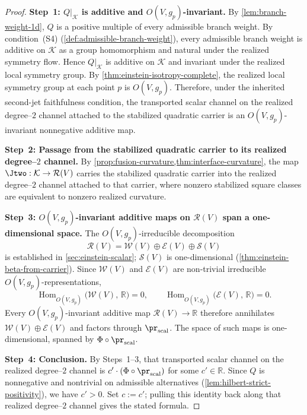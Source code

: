 \begin{proof}
\textbf{Step~1: $Q|_{\mathcal K}$ is additive and $O(V,g_p)$-invariant.}
By \cref{lem:branch-weight-1d}, $Q$ is a positive multiple of every
admissible branch weight.
By condition~\textup{(S4)} (\cref{def:admissible-branch-weight}), every
admissible branch weight is additive on $\mathcal K$ as a group
homomorphism and natural under the realized symmetry flow.
Hence $Q|_{\mathcal K}$ is additive on $\mathcal K$ and invariant under
the realized local symmetry group.
By \cref{thm:einstein-isotropy-complete}, the realized local symmetry
group at each point $p$ is $O(V,g_p)$.
Therefore, under the inherited second-jet faithfulness condition, the
transported scalar channel on the realized degree--\(2\) channel
attached to the stabilized quadratic carrier is an
$O(V,g_p)$-invariant nonnegative additive map.

\textbf{Step~2: Passage from the stabilized quadratic carrier to its realized degree--\(2\) channel.}
By \cref{prop:fusion-curvature,thm:interface-curvature}, the map
$\Jtwo : \mathcal K \to \mathcal R(V)$ carries the stabilized
quadratic carrier into the realized degree--\(2\) channel attached to
that carrier, where nonzero stabilized square classes are equivalent
to nonzero realized curvature.

\textbf{Step~3: $O(V,g_p)$-invariant additive maps on $\mathcal R(V)$
span a one-dimensional space.}
The $O(V,g_p)$-irreducible decomposition
\[
  \mathcal R(V) = \mathcal W(V) \oplus \mathcal E(V) \oplus \mathcal S(V)
\]
is established in \cref{sec:einstein-scalar};
$\mathcal S(V)$ is one-dimensional (\cref{thm:einstein-beta-from-carrier}).
Since $\mathcal W(V)$ and $\mathcal E(V)$ are non-trivial irreducible
$O(V,g_p)$-representations,
\[
  \operatorname{Hom}_{O(V,g_p)}\!\bigl(\mathcal W(V),\,\mathbb R\bigr) = 0,
  \qquad
  \operatorname{Hom}_{O(V,g_p)}\!\bigl(\mathcal E(V),\,\mathbb R\bigr) = 0.
\]
Every $O(V,g_p)$-invariant additive map $\mathcal R(V) \to \mathbb R$
therefore annihilates $\mathcal W(V) \oplus \mathcal E(V)$ and factors
through $\pr_{\mathrm{scal}}$.
The space of such maps is one-dimensional, spanned by
$\Phi \circ \pr_{\mathrm{scal}}$.

\textbf{Step~4: Conclusion.}
By Steps~1--3, that transported scalar channel on the realized
degree--\(2\) channel is
$c' \cdot (\Phi \circ \pr_{\mathrm{scal}})$
for some $c' \in \mathbb R$.
Since $Q$ is nonnegative and nontrivial on admissible alternatives
(\cref{lem:hilbert-strict-positivity}), we have $c' > 0$.
Set $c := c'$; pulling this identity back along that realized
degree--\(2\) channel gives the stated formula.
\end{proof}

